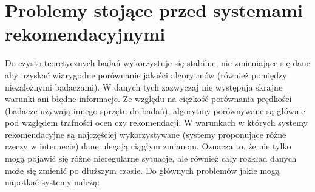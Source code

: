 \documentclass{pracamgr}
\begin{document}
  \section{Problemy stojące przed systemami rekomendacyjnymi}
   Do czysto teoretycznych badań wykorzystuje się stabilne, nie zmieniające się dane aby uzyskać wiarygodne porównanie jakości algorytmów
   (również pomiędzy niezależnymi badaczami). W danych tych zazwyczaj nie występują skrajne warunki ani błędne informacje.
   Ze względu na ciężkość porównania prędkości (badacze używają innego sprzętu do badań),
   algorytmy porównywane są głównie pod względem trafności ocen czy rekomendacji.\newline
   W warunkach w których systemy rekomendacyjne są najczęściej wykorzystywane (systemy proponujące różne rzeczy w internecie) dane ulegają ciągłym zmianom.
   Oznacza to, że nie tylko mogą pojawić się różne nieregularne sytuacje, ale również cały rozkład danych może się zmienić po dłuższym czasie.\newline
   Do głównych problemów jakie mogą napotkać systemy należą:
\end{document}
